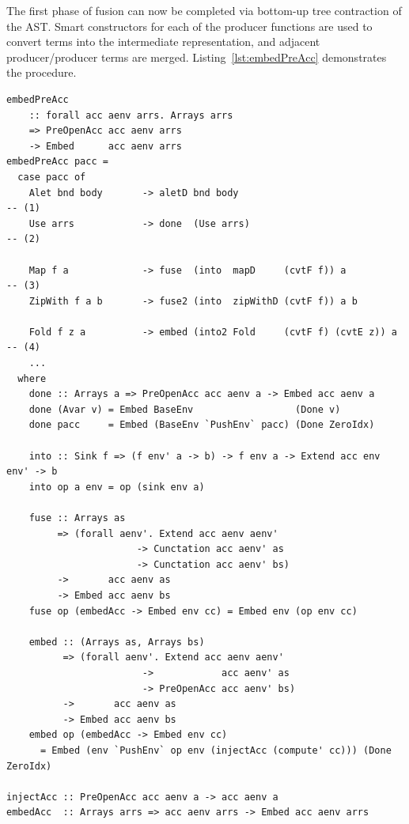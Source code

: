 The first phase of fusion can now be completed via bottom-up tree contraction of
the AST\@. Smart constructors for each of the producer functions are used to
convert terms into the intermediate representation, and adjacent
producer/producer terms are merged. Listing~\ref{lst:embedPreAcc} demonstrates
the procedure.
%
\begin{lstlisting}[style=haskell_float
    ,label=lst:embedPreAcc
    ,caption={Producer fusion via bottom-up contraction of the AST}]
embedPreAcc
    :: forall acc aenv arrs. Arrays arrs
    => PreOpenAcc acc aenv arrs
    -> Embed      acc aenv arrs
embedPreAcc pacc =
  case pacc of
    Alet bnd body       -> aletD bnd body                                              -- (1)
    Use arrs            -> done  (Use arrs)                                            -- (2)

    Map f a             -> fuse  (into  mapD     (cvtF f)) a                           -- (3)
    ZipWith f a b       -> fuse2 (into  zipWithD (cvtF f)) a b

    Fold f z a          -> embed (into2 Fold     (cvtF f) (cvtE z)) a                  -- (4)
    ...
  where
    done :: Arrays a => PreOpenAcc acc aenv a -> Embed acc aenv a
    done (Avar v) = Embed BaseEnv                  (Done v)
    done pacc     = Embed (BaseEnv `PushEnv` pacc) (Done ZeroIdx)

    into :: Sink f => (f env' a -> b) -> f env a -> Extend acc env env' -> b
    into op a env = op (sink env a)

    fuse :: Arrays as
         => (forall aenv'. Extend acc aenv aenv'
                       -> Cunctation acc aenv' as
                       -> Cunctation acc aenv' bs)
         ->       acc aenv as
         -> Embed acc aenv bs
    fuse op (embedAcc -> Embed env cc) = Embed env (op env cc)

    embed :: (Arrays as, Arrays bs)
          => (forall aenv'. Extend acc aenv aenv'
                        ->            acc aenv' as
                        -> PreOpenAcc acc aenv' bs)
          ->       acc aenv as
          -> Embed acc aenv bs
    embed op (embedAcc -> Embed env cc)
      = Embed (env `PushEnv` op env (injectAcc (compute' cc))) (Done ZeroIdx)

injectAcc :: PreOpenAcc acc aenv a -> acc aenv a
embedAcc  :: Arrays arrs => acc aenv arrs -> Embed acc aenv arrs
\end{lstlisting}

